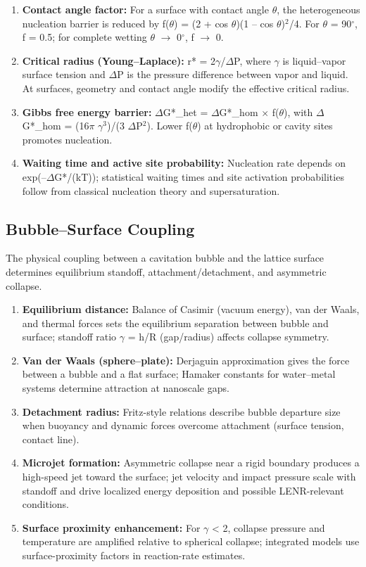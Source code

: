 \documentclass[11pt,a4paper]{article}
\begin{document}
\begin{enumerate}
\def\labelenumi{\arabic{enumi}.}
\item
  \textbf{Contact angle factor:} For a surface with contact angle $\theta$, the heterogeneous nucleation barrier is reduced by f($\theta$) = (2 + cos $\theta$)(1 -- cos $\theta$)$^{2}$/4. For $\theta$ = 90$^{\circ}$, f = 0.5; for complete wetting $\theta$ $\rightarrow$ 0$^{\circ}$, f $\rightarrow$ 0.
\item
  \textbf{Critical radius (Young--Laplace):} r* = 2$\gamma$/$\Delta$P, where $\gamma$ is liquid--vapor surface tension and $\Delta$P is the pressure difference between vapor and liquid. At surfaces, geometry and contact angle modify the effective critical radius.
\item
  \textbf{Gibbs free energy barrier:} $\Delta$G*\_het = $\Delta$G*\_hom $\times$ f($\theta$), with $\Delta$G*\_hom = (16$\pi$ $\gamma$$^{3}$)/(3 $\Delta$P$^{2}$). Lower f($\theta$) at hydrophobic or cavity sites promotes nucleation.
\item
  \textbf{Waiting time and active site probability:} Nucleation rate depends on exp(--$\Delta$G*/(kT)); statistical waiting times and site activation probabilities follow from classical nucleation theory and supersaturation.
\end{enumerate}

\subsection{Bubble--Surface Coupling}

The physical coupling between a cavitation bubble and the lattice surface determines equilibrium standoff, attachment/detachment, and asymmetric collapse.

\begin{enumerate}
\def\labelenumi{\arabic{enumi}.}
\item
  \textbf{Equilibrium distance:} Balance of Casimir (vacuum energy), van der Waals, and thermal forces sets the equilibrium separation between bubble and surface; standoff ratio $\gamma$ = h/R (gap/radius) affects collapse symmetry.
\item
  \textbf{Van der Waals (sphere--plate):} Derjaguin approximation gives the force between a bubble and a flat surface; Hamaker constants for water--metal systems determine attraction at nanoscale gaps.
\item
  \textbf{Detachment radius:} Fritz-style relations describe bubble departure size when buoyancy and dynamic forces overcome attachment (surface tension, contact line).
\item
  \textbf{Microjet formation:} Asymmetric collapse near a rigid boundary produces a high-speed jet toward the surface; jet velocity and impact pressure scale with standoff and drive localized energy deposition and possible LENR-relevant conditions.
\item
  \textbf{Surface proximity enhancement:} For $\gamma$ \textless{} 2, collapse pressure and temperature are amplified relative to spherical collapse; integrated models use surface-proximity factors in reaction-rate estimates.
\end{enumerate}
\end{document}
